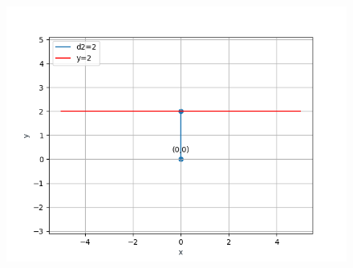 \documentclass[12pt]{article}
\begin{document}
\begin{enumerate}
                  \begin{figure}[!h]
	\begin{center} 
	    \includegraphics[width=\columnwidth]{./figs/line2.png}
	\end{center}
\caption{}
\label{fig:Fig}
\end{figure}
	

\end{enumerate}
\end{document}
